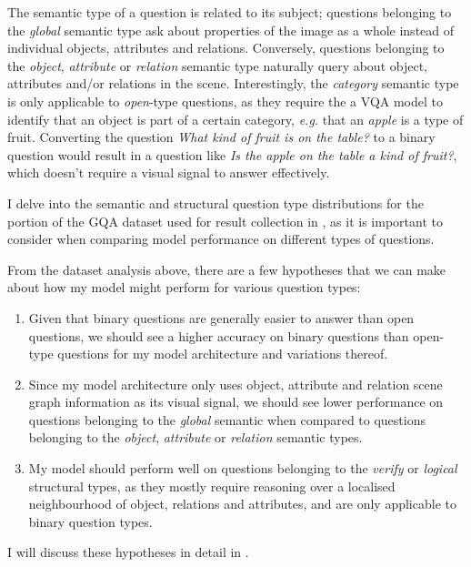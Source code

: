 The semantic type of a question is related to its subject; questions belonging to the \textit{global} semantic type ask about properties of the image as a whole instead of individual objects, attributes and relations. Conversely, questions belonging to the \textit{object}, \textit{attribute} or \textit{relation} semantic type naturally query about object, attributes and/or relations in the scene. Interestingly, the \textit{category} semantic type is only applicable to \textit{open}-type questions, as they require the a VQA model to identify that an object is part of a certain category, \textit{e.g.} that an \textit{apple} is a type of fruit. Converting the question \textit{What kind of fruit is on the table?} to a binary question would result in a question like \textit{Is the apple on the table a kind of fruit?}, which doesn't require a visual signal to answer effectively.

I delve into the semantic and structural question type distributions for the portion of the GQA dataset used for result collection in \sectionautorefname{ \ref{sec:ablation_studies}}, as it is important to consider when comparing model performance on different types of questions.

From the dataset analysis above, there are a few hypotheses that we can make about how my model might perform for various question types:

\begin{enumerate}
    \item Given that binary questions are generally easier to answer than open questions, we should see a higher accuracy on binary questions than open-type questions for my model architecture and variations thereof.
    \item Since my model architecture only uses object, attribute and relation scene graph information as its visual signal, we should see lower performance on questions belonging to the \textit{global} semantic when compared to questions belonging to the \textit{object}, \textit{attribute} or \textit{relation} semantic types.
    \item My model should perform well on questions belonging to the \textit{verify} or \textit{logical} structural types, as they mostly require reasoning over a localised neighbourhood of object, relations and attributes, and are only applicable to binary question types.
\end{enumerate}

I will discuss these hypotheses in detail in \sectionautorefname{ \ref{sec:ablation_studies}}.

